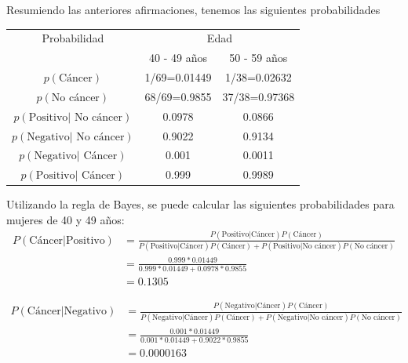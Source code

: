 \documentclass[10pt,openright]{book}\usepackage[]{graphicx}\usepackage[]{color}
\begin{document}
\begin{Eje}
Resumiendo las anteriores afirmaciones, tenemos las siguientes probabilidades
\begin{table}[!h]
\centering
  \begin{tabular}{|c|c|c|}\hline
  Probabilidad&\multicolumn{2}{|c|}{Edad}\\\cline{2-3}
  &40 - 49 años&50 - 59 años\\\hline
  $p(\text{Cáncer})$&1/69=0.01449&1/38=0.02632\\
  $p(\text{No cáncer})$&68/69=0.9855&37/38=0.97368\\
  $p(\text{Positivo}|\text{ No cáncer})$&0.0978&0.0866\\
  $p(\text{Negativo}|\text{ No cáncer})$&0.9022&0.9134\\
  $p(\text{Negativo}|\text{ Cáncer})$&0.001&0.0011\\
  $p(\text{Positivo}|\text{ Cáncer})$&0.999&0.9989\\\hline
  \end{tabular}
\end{table}

Utilizando la regla de Bayes, se puede calcular las siguientes probabilidades para mujeres de 40 y 49 años: 
\begin{align*}
P(\text{Cáncer}|\text{Positivo})&=\frac{P(\text{Positivo}|\text{Cáncer})P(\text{Cáncer})}{P(\text{Positivo}|\text{Cáncer})P(\text{Cáncer})+P(\text{Positivo}|\text{No cáncer})P(\text{No cáncer})}\\
&=\frac{0.999*0.01449}{0.999*0.01449+0.0978*0.9855}\\
&=0.1305
\end{align*}

\begin{align*}
P(\text{Cáncer}|\text{Negativo})&=\frac{P(\text{Negativo}|\text{Cáncer})P(\text{Cáncer})}{P(\text{Negativo}|\text{Cáncer})P(\text{Cáncer})+P(\text{Negativo}|\text{No cáncer})P(\text{No cáncer})}\\
&=\frac{0.001*0.01449}{0.001*0.01449+0.9022*0.9855}\\
&=0.0000163
\end{align*}


\end{Eje}
\end{document}
